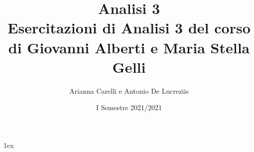 \documentclass[a4paper, 12pt]{article}
\title{{\Huge Analisi 3}\\{\small Esercitazioni di Analisi 3 del corso di Giovanni Alberti e Maria Stella Gelli}}
\author{Arianna Carelli e Antonio De Lucreziis}
\date{I Semestre 2021/2021}
\begin{document}
%
%
\parskip 1ex
\setlength{\parindent}{0pt}

\maketitle

\tableofcontents

\newpage


















\end{document}
